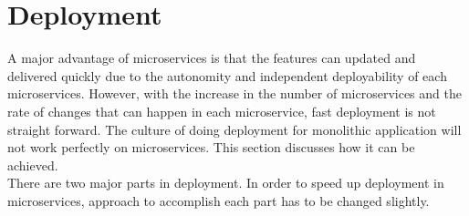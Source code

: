 \section{Deployment}\label{section:challanges_of_microservices_architecture/deployment}
A major advantage of microservices is that the features can updated and delivered quickly due to the autonomity and independent deployability of each microservices. However, with the increase in the number of microservices and the rate of changes that can happen in each microservice, fast deployment is not straight forward. The culture of doing deployment for monolithic application will not work perfectly on microservices. This section discusses how it can be achieved.
\\
There are two major parts in deployment. In order to speed up deployment in microservices, approach to accomplish each part has to be changed slightly.
